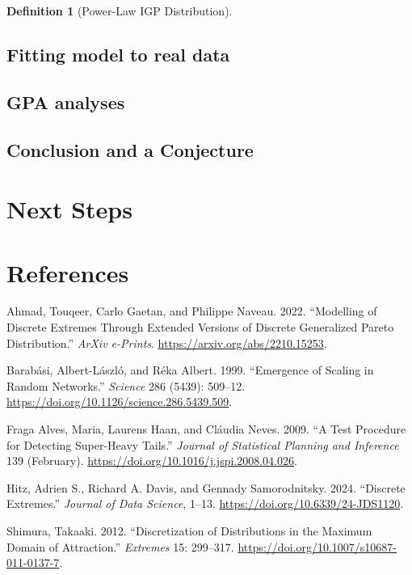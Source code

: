 \documentclass[
  10pt,
  a4paper,
]{scrreprt}
\newlength{\cslhangindent}
\newlength{\cslentryspacingunit} %
\newenvironment{CSLReferences}[2] %
 {%
  \setlength{\parindent}{0pt}
  \ifodd #1
  \let\oldpar\par
  \def\par{\hangindent=\cslhangindent\oldpar}
  \fi
  \setlength{\parskip}{#2\cslentryspacingunit}
 }%
 {}
\theoremstyle{definition}
\newtheorem{definition}{Definition}[section]
\theoremstyle{plain}
\theoremstyle{remark}
\begin{document}
{\begin{definition}[Power-Law IGP
Distribution]
\end{definition}

\hypertarget{fitting-model-to-real-data}{%
\section{Fitting model to real data}\label{fitting-model-to-real-data}}

\hypertarget{gpa-analyses}{%
\section{GPA analyses}\label{gpa-analyses}}

\hypertarget{conclusion-and-a-conjecture}{%
\section{Conclusion and a
Conjecture}\label{conclusion-and-a-conjecture}}

\hypertarget{next-steps}{%
\chapter{Next Steps}\label{next-steps}}

\newpage{}

\hypertarget{references}{%
\chapter*{References}\label{references}}

\hypertarget{refs}{}
\begin{CSLReferences}{1}{0}
\leavevmode{}%
Ahmad, Touqeer, Carlo Gaetan, and Philippe Naveau. 2022. {``Modelling of
Discrete Extremes Through Extended Versions of Discrete Generalized
Pareto Distribution.''} \emph{ArXiv e-Prints}.
\url{https://arxiv.org/abs/2210.15253}.

\leavevmode{}%
Barabási, Albert-László, and Réka Albert. 1999. {``Emergence of Scaling
in Random Networks.''} \emph{Science} 286 (5439): 509--12.
\url{https://doi.org/10.1126/science.286.5439.509}.

\leavevmode{}%
Fraga Alves, Maria, Laurens Haan, and Cláudia Neves. 2009. {``A Test
Procedure for Detecting Super-Heavy Tails.''} \emph{Journal of
Statistical Planning and Inference} 139 (February).
\url{https://doi.org/10.1016/j.jspi.2008.04.026}.

\leavevmode{}%
Hitz, Adrien S., Richard A. Davis, and Gennady Samorodnitsky. 2024.
{``Discrete Extremes.''} \emph{Journal of Data Science}, 1--13.
\url{https://doi.org/10.6339/24-JDS1120}.

\leavevmode{}%
Shimura, Takaaki. 2012. {``Discretization of Distributions in the
Maximum Domain of Attraction.''} \emph{Extremes} 15: 299--317.
\url{https://doi.org/10.1007/s10687-011-0137-7}.

\end{CSLReferences}
\end{document}
